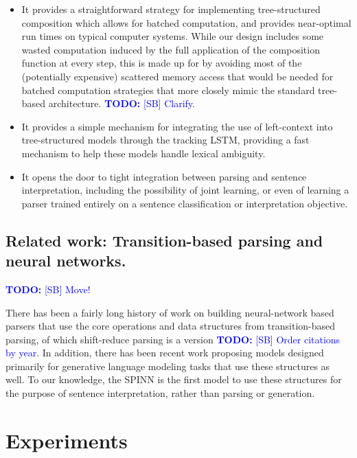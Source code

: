 \documentclass[11pt]{article}
\newcommand\todo[1]{\textcolor{blue}{\textbf{TODO:} #1}}
\begin{document}
\begin{itemize}
\item It provides a straightforward strategy for implementing tree-structured composition which allows for batched computation, and provides near-optimal run times on typical computer systems. While our design includes some wasted computation induced by the full application of the composition function at every step, this is made up for by avoiding most of the (potentially expensive) scattered memory access that would be needed for batched computation strategies that more closely mimic the standard tree-based architecture. \todo{[SB] Clarify.}

\item It provides a simple mechanism for integrating the use of left-context into tree-structured models through the tracking LSTM, providing a fast mechanism to help these models handle lexical ambiguity.

\item It opens the door to tight integration between parsing and sentence interpretation, including the possibility of joint learning, or even of learning a parser trained entirely on a sentence classification or interpretation objective.
\end{itemize}

\subsection{Related work: Transition-based parsing and neural networks.}
\todo{[SB] Move!}

There has been a fairly long history of work on building neural-network based parsers that use the core operations and data structures from transition-based parsing, of which shift-reduce parsing is a version \citep{henderson2004discriminative,emami2005neural,titov2010latent,buys2generative,chen2014,dyer-EtAl:2015:ACL-IJCNLP,kiperwasser2016easy} \todo{[SB] Order citations by year}. In addition, there has been recent work \citep{zhang2016top,dyer2016rnn} proposing models designed primarily for generative language modeling tasks that use these structures as well. To our knowledge, the SPINN is the first model to use these structures for the purpose of sentence interpretation, rather than parsing or generation.

\section{Experiments}
\end{document}
